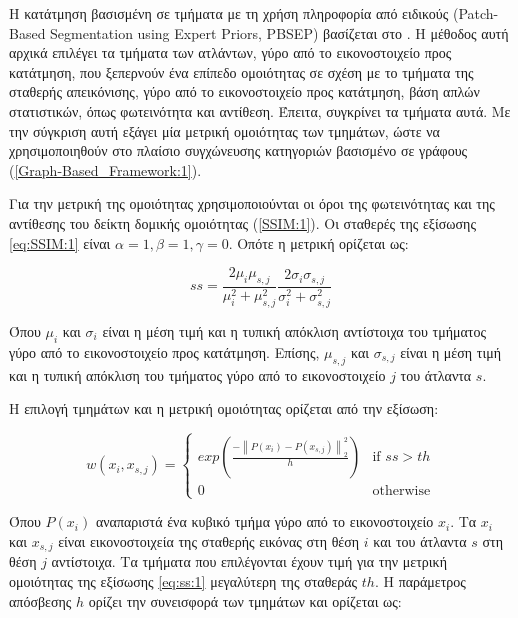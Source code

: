 \documentclass[a4paper,12pt]{article}
\newcommand\norm[1]{\left\lVert#1\right\rVert}
\begin{document}
Η κατάτμηση βασισμένη σε τμήματα με τη χρήση πληροφορία από ειδικούς
(Patch-Based Segmentation using Expert Priors, PBSEP) βασίζεται στο
\cite{Coupe:1}. Η μέθοδος αυτή αρχικά επιλέγει τα τμήματα των ατλάντων, γύρο από
το εικονοστοιχείο προς κατάτμηση, που ξεπερνούν ένα επίπεδο ομοιότητας σε σχέση
με το τμήματα της σταθερής απεικόνισης, γύρο από το εικονοστοιχείο προς
κατάτμηση, βάση απλών στατιστικών, όπως φωτεινότητα και αντίθεση. Έπειτα,
συγκρίνει τα τμήματα αυτά. Με την σύγκριση αυτή εξάγει μία μετρική ομοιότητας
των τμημάτων, ώστε να χρησιμοποιηθούν στο πλαίσιο συγχώνευσης κατηγοριών
βασισμένο σε γράφους (\ref{Graph-Based_Framework:1}).

Για την μετρική της ομοιότητας χρησιμοποιούνται οι όροι της φωτεινότητας και της
αντίθεσης του δείκτη δομικής ομοιότητας (\ref{SSIM:1}). Οι σταθερές της εξίσωσης
\eqref{eq:SSIM:1} είναι $\alpha = 1, \beta = 1, \gamma = 0$. Οπότε η μετρική
ορίζεται ως:

\begin{equation} \label{eq:ss:1}
    ss = \frac {2 \mu_i \mu_{s,j}} {\mu_i^2 + \mu_{s,j}^2} 
         \frac {2 \sigma_i \sigma_{s,j}} {\sigma_i^2 + \sigma_{s,j}^2}
\end{equation}

Όπου $\mu_i$ και $\sigma_i$ είναι η μέση τιμή και η τυπική απόκλιση αντίστοιχα
του τμήματος γύρο από το εικονοστοιχείο προς κατάτμηση. Επίσης, $\mu_{s,j}$ και
$\sigma_{s,j}$ είναι η μέση τιμή και η τυπική απόκλιση του τμήματος γύρο από το
εικονοστοιχείο $j$ του άτλαντα $s$.

Η επιλογή τμημάτων και η μετρική ομοιότητας ορίζεται από την εξίσωση:

\begin{equation} \label{eq:w_PBSEP:1}
    w(x_i, x_{s,j}) = 
    \begin{cases}
        exp\left( \frac {- \norm{P(x_i) - P(x_{s,j})}_2^2 } {h} \right)
            & \text{if } ss > th\\
        0   & \text{otherwise}
    \end{cases}
\end{equation}

Όπου $P(x_i)$ αναπαριστά ένα κυβικό τμήμα γύρο από το εικονοστοιχείο $x_i$. Τα
$x_i$ και $x_{s,j}$ είναι εικονοστοιχεία της σταθερής εικόνας στη θέση $i$ και
του άτλαντα $s$ στη θέση $j$ αντίστοιχα. Τα τμήματα που επιλέγονται έχουν τιμή
για την μετρική ομοιότητας της εξίσωσης \eqref{eq:ss:1} μεγαλύτερη της σταθεράς
$th$. Η παράμετρος απόσβεσης $h$ ορίζει την συνεισφορά των τμημάτων και ορίζεται
ως:
\end{document}
